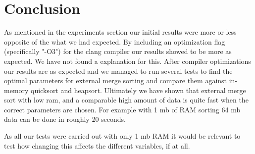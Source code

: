 \section{Conclusion}
As mentioned in the experiments section our initial results were more or less opposite of the what we had expected. By including an optimization flag (specifically "-O3") for the clang compiler our results showed to be more as expected. We have not found a explanation for this.
After compiler optimizations our results are as expected and we managed to run several tests to find the optimal parameters for external merge sorting and compare them against in-memory quicksort and heapsort. Ultimately we have shown that external merge sort with low ram, and a comparable high amount of data is quite fast when the correct parameters are chosen. For example with 1 mb of RAM sorting 64 mb data can be done in roughly 20 seconds.

As all our tests were carried out with only 1 mb RAM it would be relevant to test how changing this affects the different variables, if at all.